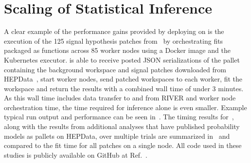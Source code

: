 \section{Scaling of Statistical Inference}\label{sec:results}
%
A clear example of the performance gains provided by deploying \pyhf{} on \funcX{} is the execution of the 125 signal hypothesis patches from~\cite{SUSY-2019-08} by orchestrating \pyhf{} fits packaged as \funcX{} functions across 85 worker nodes using a Docker image and the Kubernetes \funcX{} executor.
\funcX{} is able to receive posted JSON serializations of the \pyhf{} pallet containing the background workspace and signal patches downloaded from HEPData~\cite{ATLAS_SUSY_1Lbb_pallet}, start \funcX{} worker nodes, send patched workspaces to each worker, fit the workspace and return the results with a combined wall time of under 3 minutes.
As this wall time includes data transfer to and from RIVER and worker node orchestration time, the time required for inference alone is even smaller.
Example typical run output and performance can be seen in~.
The timing results for~\cite{ATLAS_SUSY_1Lbb_pallet}, along with the results from additional analyses that have published probability models as \pyhf{} pallets on HEPData, over multiple trials are summarized in~ and compared to the fit time for all patches on a single node.
All code used in these studies is publicly available on GitHub at Ref.~\cite{study_code}.


